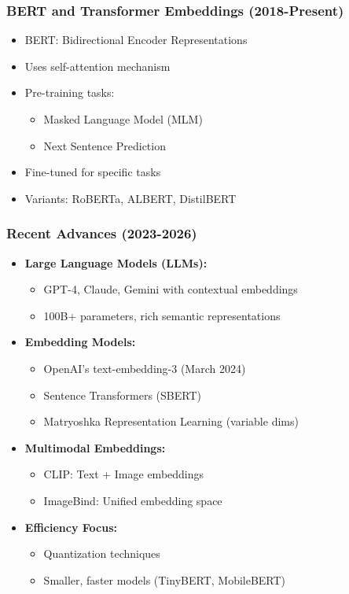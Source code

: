\begin{frame}[fragile]\frametitle{BERT and Transformer Embeddings (2018-Present)}
\begin{itemize}
\item BERT: Bidirectional Encoder Representations
\item Uses self-attention mechanism
\item Pre-training tasks:
  \begin{itemize}
  \item Masked Language Model (MLM)
  \item Next Sentence Prediction
  \end{itemize}
\item Fine-tuned for specific tasks
\item Variants: RoBERTa, ALBERT, DistilBERT
\end{itemize}
\end{frame}

\begin{frame}[fragile]\frametitle{Recent Advances (2023-2026)}
\begin{itemize}
\item \textbf{Large Language Models (LLMs):}
  \begin{itemize}
  \item GPT-4, Claude, Gemini with contextual embeddings
  \item 100B+ parameters, rich semantic representations
  \end{itemize}
\item \textbf{Embedding Models:}
  \begin{itemize}
  \item OpenAI's text-embedding-3 (March 2024)
  \item Sentence Transformers (SBERT)
  \item Matryoshka Representation Learning (variable dims)
  \end{itemize}
\item \textbf{Multimodal Embeddings:}
  \begin{itemize}
  \item CLIP: Text + Image embeddings
  \item ImageBind: Unified embedding space
  \end{itemize}
\item \textbf{Efficiency Focus:}
  \begin{itemize}
  \item Quantization techniques
  \item Smaller, faster models (TinyBERT, MobileBERT)
  \end{itemize}
\end{itemize}
\end{frame}

